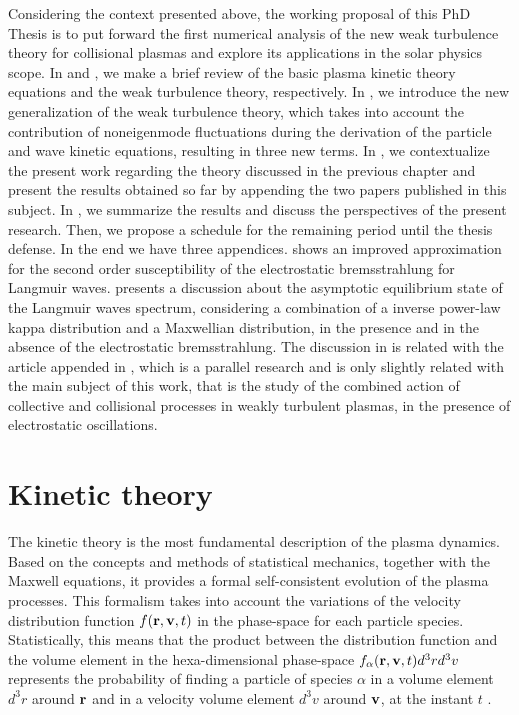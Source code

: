 \documentclass[12pt,a4paper,ruledheader]{report}
\begin{document}
Considering the context presented above, the working proposal of
this PhD Thesis is to put forward the first numerical analysis of
the new weak turbulence theory for collisional plasmas \cite{YZKS16}
and explore its applications in the solar physics scope. In
 and , we make a brief review
of the basic plasma kinetic theory equations and the weak turbulence
theory, respectively. In , we introduce the
new generalization of the weak turbulence theory, which takes into
account the contribution of noneigenmode fluctuations during the
derivation of the particle and wave kinetic equations, resulting
in three new terms. In , we contextualize the present
work regarding the theory discussed in the previous chapter and
present the results obtained so far by appending the two papers
published in this subject. In , we summarize the
results and discuss the perspectives of the present research. Then,
we propose a schedule for the remaining period until the thesis
defense. In the end we have three appendices.  shows
an improved approximation for the second order susceptibility of
the electrostatic bremsstrahlung for Langmuir waves. 
presents a discussion about the asymptotic equilibrium state of the
Langmuir waves spectrum, considering a combination of a inverse
power-law kappa distribution and a Maxwellian distribution, in the
presence and in the absence of the electrostatic bremsstrahlung.
The discussion in  is related with the article appended
in , which is a parallel research and is only slightly
related with the main subject of this work, that is the study of the
combined action of collective and collisional processes in weakly
turbulent plasmas, in the presence of electrostatic oscillations.


\chapter{Kinetic theory}
\label{cha:kin-theo}
The kinetic theory is the most fundamental description of the
plasma dynamics. Based on the concepts and methods of statistical
mechanics, together with the Maxwell equations, it provides a
formal self-consistent evolution of the plasma processes. This
formalism takes into account the variations of the velocity
distribution function $f({\bf r},{\bf v},t)$ in the phase-space
for each particle species. Statistically, this means that the
product between the distribution function and the volume element
in the hexa-dimensional phase-space $f_\alpha({\bf r},{\bf v},t)d^3r d^3v$
represents the probability of finding a particle of species
$\alpha$ in a volume element $d^3r$ around ${\bf r}$ and in a
velocity volume element $d^3v$ around ${\bf v}$, at the instant
$t$ \cite{klimo,klimon}.
\end{document}
